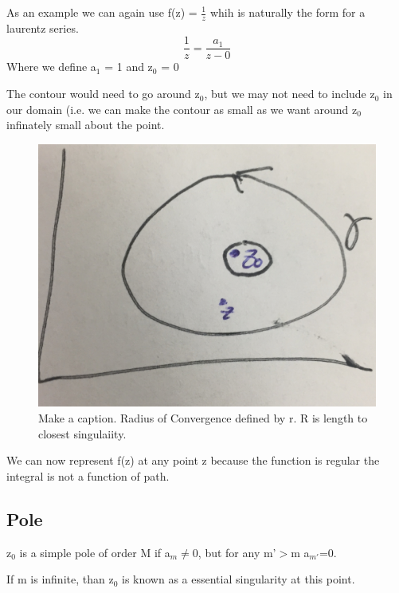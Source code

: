 \documentclass{article}
\newcommand{\be}{\begin{equation}}
\newcommand{\ee}{\end{equation}}
\begin{document}
As an example we can again use f(z) = $\frac{1}{z}$ whih is naturally the form for a laurentz series.
\be
\frac{1}{z} =\frac{a_1}{z-0}
\ee
Where we define a$_1$ = 1 and z$_0$ = 0

The contour would need to go around z$_0$, but we may not need to include z$_0$ in our domain (i.e. we can make the contour as small as we want around z$_0$ infinately small about the point. 
\begin{figure}[H]
  \centering
    \includegraphics[scale=0.2]{Figures/laurent.png}
    \caption{Make a caption. Radius of Convergence defined by r. R is length to closest singulaiity.}
\end{figure}

We can now represent f(z) at any point z because the function is regular the integral is not a function of path. 

\subsection*{Pole}
z$_0$ is a simple pole of order M if a$_m \neq 0$, but for any m'$>$m a$_{m'}$=0.

If m is infinite, than z$_0$ is known as a essential singularity at this point. 
\end{document}

